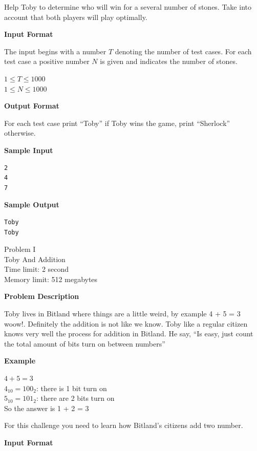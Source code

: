 \documentclass[11pt]{article}
\begin{document}
Help Toby to determine who will win for a several number of stones. Take into account that both players will play optimally.

\textbf{\large Input Format}

The input begins with a number $T$ denoting the number of test cases. For each
test case a positive number $N$ is given and indicates the number of stones.

$ 1 \le T \le 1000 $ \\
$ 1 \le N \le 1000 $

\textbf{\large Output Format}

For each test case print ``Toby'' if Toby wins the game, print ``Sherlock'' otherwise.

\textbf{\large Sample Input}

\begin{verbatim}
2
4
7
\end{verbatim}

\textbf{\large Sample Output}

\begin{verbatim}
Toby
Toby
\end{verbatim}

\newpage

        \begin{center}
            {\LARGE Problem I}\\
            {\Large Toby And Addition}\\
            {Time limit: 2 second}\\
            {Memory limit: 512 megabytes}
        \end{center}\textbf{\large Problem Description}

Toby lives in Bitland where things are a little weird,
by example 4 + 5 = 3 woow!. Definitely the addition is not like we know.
Toby like a regular citizen knows very well the process for addition in Bitland.
He say, ``Is easy, just count the total amount of bits turn on between numbers''

\textbf{\large Example}

$4 + 5 = 3$ \\
$4_{10} = 100_{2}$: there is 1 bit turn on \\
$5_{10} = 101_{2}$: there are 2 bits turn on \\

So the answer is 1 + 2 = 3

For this challenge you need to learn how Bitland's citizens add two number.

\textbf{\large Input Format}
\end{document}
